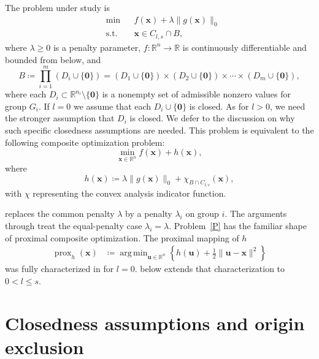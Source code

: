 \documentclass[11pt,a4paper]{article}
\theoremstyle{plain}
\theoremstyle{definition}
\theoremstyle{remark}
\newcommand*{\vz}{\mathbf{0}}
\newcommand*\R{\mathbb{R}}
\newcommand*\x{\mathbf{x}}
\newcommand*\U{\mathbf{u}}
\newcommand*\prox{\operatorname{prox}}
\DeclareMathOperator*{\argmin}{arg\,min}
\newcommand*{\norm}[1]{\|#1\|}
\begin{document}
The problem under study is
\begin{equation}
  \tag{P0}
  \label{P0}
  \begin{aligned}
     & \min                &  & f(\x)+\lambda\|g(\x)\|_0 \\
     & \operatorname{s.t.} &  & \x \in C_{l,s} \cap B,
  \end{aligned}
\end{equation}
where \(\lambda \geq 0\) is a penalty parameter, \(f: \R^n \to \R\) is
continuously differentiable and bounded from below, and
\begin{equation}
  \label{B}
  B \coloneqq \prod_{i=1}^m\left(D_i \cup\{\vz\}\right) =
  \left(D_1 \cup\{\vz\}\right) \times\left(D_2 \cup\{\vz\}\right)
  \times \cdots \times\left(D_m \cup\{\vz\}\right),
\end{equation}
where each \( D_i \subset \R^{n_i} \setminus \{ \vz \} \) is a nonempty
set of admissible nonzero values for group \( G_i \).
If \( l = 0 \) we assume that each \( D_i \cup \{ \vz \} \) is closed.
As for \( l > 0 \), we need the stronger assumption that \( D_i \) is closed.
We defer to  the discussion on why such specific closedness assumptions are needed.
This problem is equivalent to the following composite optimization
problem:
\begin{equation}
  \label{P}
  \min _{\x \in \R^n} f(\x)+h(\x),
\end{equation}
where
\begin{equation}
  \label{h}
  h(\x) \coloneqq\lambda\|g(\x)\|_0+\chi_{B \cap C_{l,s}}(\x),
\end{equation}
with $\chi$ representing the convex analysis indicator function.

 replaces the common penalty \(\lambda\) by a penalty
\(\lambda_i\) on group \(i\).
The arguments through  treat the equal-penalty case \(\lambda_i=\lambda\).
Problem~\eqref{P} has the familiar shape of proximal composite optimization.
The proximal mapping of \(h\)
\begin{equation}
  \label{prox}
  \begin{aligned}
    \prox_{h}(\x) & \coloneqq\argmin_{\U\in\R^n}\left\{h(\U)+ \frac{1}{2}\norm{\U-\x}^2 \right\}
  \end{aligned}
\end{equation}
was fully characterized in \cite{beck2018} for \(l=0\).  below
extends that characterization to \(0<l\leq s\).

\section{Closedness assumptions and origin exclusion}
\label{sec:emptyfix}
\end{document}
